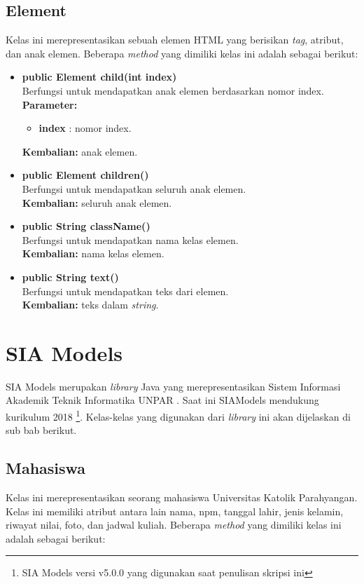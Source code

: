 \subsection{Element}

Kelas ini merepresentasikan sebuah elemen HTML yang berisikan \textit{tag}, atribut, dan anak elemen. Beberapa \textit{method} yang dimiliki kelas ini adalah sebagai berikut:
\begin{itemize}
	\item \textbf{public Element child(int index)} \\
		Berfungsi untuk mendapatkan anak elemen berdasarkan nomor index. \\
		\textbf{Parameter:} 
		\begin{itemize}
			\item \textbf{index} : nomor index.
		\end{itemize}
		\textbf{Kembalian:} anak elemen.	
		
		\item \textbf{public Element children()} \\
		Berfungsi untuk mendapatkan seluruh anak elemen. \\
		\textbf{Kembalian:} seluruh anak elemen.	
		
		\item \textbf{public String className()} \\
		Berfungsi untuk mendapatkan nama kelas elemen. \\
		\textbf{Kembalian:} nama kelas elemen.	
		
		\item \textbf{public String text()} \\
		Berfungsi untuk mendapatkan teks dari elemen. \\
		\textbf{Kembalian:} teks dalam \textit{string}.	
\end{itemize}

\section{SIA Models}
SIA Models merupakan \textit{library} Java yang merepresentasikan Sistem Informasi Akademik Teknik Informatika UNPAR \cite{siamodels}. Saat ini SIAModels mendukung kurikulum 2018 \footnote{SIA Models versi v5.0.0 yang digunakan saat penulisan skripsi ini}. Kelas-kelas yang digunakan dari \textit{library} ini akan dijelaskan di sub bab berikut.

\subsection{Mahasiswa}
Kelas ini merepresentasikan seorang mahasiswa Universitas Katolik Parahyangan. Kelas ini memiliki atribut antara lain nama, npm, tanggal lahir, jenis kelamin, riwayat nilai, foto, dan jadwal kuliah. Beberapa \textit{method} yang dimiliki kelas ini adalah sebagai berikut:

